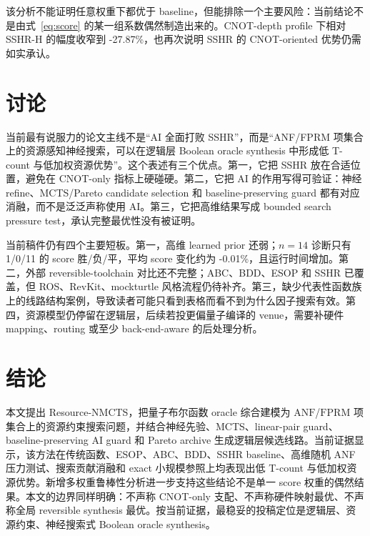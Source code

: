 \documentclass[UTF8,fontset=macnew,11pt]{ctexart}
\newcommand{\method}{Resource-NMCTS}
\newcommand{\anf}{\ensuremath{\mathrm{ANF}}}
\newcommand{\fprm}{\ensuremath{\mathrm{FPRM}}}
\begin{document}
\begin{table}[t]
\centering
\scriptsize
\caption{多资源权重鲁棒性分析。单元格为 score 胜/负/平与平均相对变化。}
\label{tab:weight-robustness}

\end{table}

该分析不能证明任意权重下都优于 baseline，但能排除一个主要风险：当前结论不是由式~\eqref{eq:score} 的某一组系数偶然制造出来的。CNOT-depth profile 下相对 SSHR-H 的幅度收窄到 -27.87\%，也再次说明 SSHR 的 CNOT-oriented 优势仍需如实承认。

\section{讨论}

当前最有说服力的论文主线不是“AI 全面打败 SSHR”，而是“ANF/FPRM 项集合上的资源感知神经搜索，可以在逻辑层 Boolean oracle synthesis 中形成低 T-count 与低加权资源优势”。这个表述有三个优点。第一，它把 SSHR 放在合适位置，避免在 CNOT-only 指标上硬碰硬。第二，它把 AI 的作用写得可验证：神经 refine、MCTS/Pareto candidate selection 和 baseline-preserving guard 都有对应消融，而不是泛泛声称使用 AI。第三，它把高维结果写成 bounded search pressure test，承认完整最优性没有被证明。

当前稿件仍有四个主要短板。第一，高维 learned prior 还弱；$n=14$ 诊断只有 1/0/11 的 score 胜/负/平，平均 score 变化约为 -0.01\%，且运行时间增加。第二，外部 reversible-toolchain 对比还不完整；ABC、BDD、ESOP 和 SSHR 已覆盖，但 ROS、RevKit、mockturtle 风格流程仍待补齐。第三，缺少代表性函数族上的线路结构案例，导致读者可能只看到表格而看不到为什么因子搜索有效。第四，资源模型仍停留在逻辑层，后续若投更偏量子编译的 venue，需要补硬件 mapping、routing 或至少 back-end-aware 的后处理分析。

\section{结论}

本文提出 \method{}，把量子布尔函数 oracle 综合建模为 \anf{}/\fprm{} 项集合上的资源约束搜索问题，并结合神经先验、MCTS、linear-pair guard、baseline-preserving AI guard 和 Pareto archive 生成逻辑层候选线路。当前证据显示，该方法在传统函数、ESOP、ABC、BDD、SSHR baseline、高维随机 ANF 压力测试、搜索贡献消融和 exact 小规模参照上均表现出低 T-count 与低加权资源优势。新增多权重鲁棒性分析进一步支持这些结论不是单一 score 权重的偶然结果。本文的边界同样明确：不声称 CNOT-only 支配、不声称硬件映射最优、不声称全局 reversible synthesis 最优。按当前证据，最稳妥的投稿定位是逻辑层、资源约束、神经搜索式 Boolean oracle synthesis。
\end{document}
